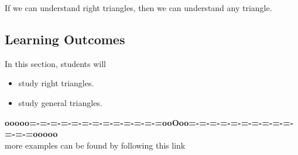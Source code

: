 \documentclass{ximera}
\begin{document}
If we can understand right triangles, then we can understand any triangle.










\subsection{Learning Outcomes}


\begin{sectionOutcomes}
In this section, students will 

\begin{itemize}
\item study right triangles.
\item study general triangles.
\end{itemize}
\end{sectionOutcomes}









\begin{center}
\textbf{\textcolor{green!50!black}{ooooo=-=-=-=-=-=-=-=-=-=-=-=-=ooOoo=-=-=-=-=-=-=-=-=-=-=-=-=ooooo}} \\

more examples can be found by following this link\\ 

\end{center}
\end{document}
